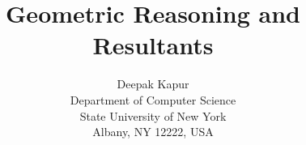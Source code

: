\title{Geometric Reasoning and Resultants}
\author{Deepak Kapur \\
Department of Computer Science \\
State University of New York \\
Albany, NY 12222, USA}
\date{} 

\pagestyle{empty}
\maketitle


